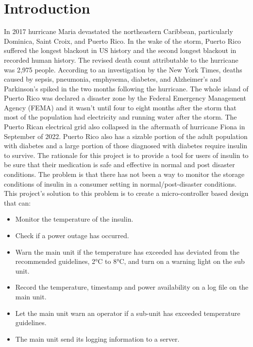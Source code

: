 \section{Introduction}
In 2017 hurricane Maria devastated the northeastern Caribbean, particularly Dominica, Saint Croix, and Puerto Rico. In the wake of the storm, Puerto Rico suffered the longest blackout in US history and the second longest blackout in recorded human history\cite{WorldSecondLargest}. The revised death count attributable to the hurricane was 2,975 people\cite{HurricaneMariaCaused2018}. According to an investigation by the New York Times, deaths caused by  sepsis, pneumonia, emphysema, diabetes, and Alzheimer's and Parkinson's spiked in the two months following the hurricane\cite{roblesOfficialTollPuerto2017}. The whole island of Puerto Rico was declared a disaster zone by the Federal Emergency Management Agency (FEMA) and it wasn't until four to eight months after the storm that most of the population had electricity and running water after the storm. The Puerto Rican electrical grid also collapsed in the aftermath of hurricane Fiona in September of 2022. Puerto Rico also has a sizable portion of the adult population with diabetes and a large portion of those diagnosed with diabetes require insulin to survive\cite{DiabetesPrevalencePopulation}. The rationale for this project is to provide a tool for users of insulin to be sure that their medication is safe and effective in normal and post disaster conditions. The problem is that there has not been a way to monitor the storage conditions of insulin in a consumer setting in normal/post-disaster conditions. This project's solution to this problem is to create a micro-controller based design that can:
\begin{itemize}
  \item Monitor the temperature of the insulin.
  \item Check if a power outage has occurred.
  \item Warn the main unit if the temperature has exceeded has deviated from the recommended guidelines, 2\si{\celsius} to 8\si{\celsius}, and turn on a warning light on the sub unit.
  \item Record the temperature, timestamp and power availability on a log file on the main unit.
  \item Let the main unit warn an operator if a sub-unit has exceeded temperature guidelines.
  \item The main unit send its logging information to a server.
\end{itemize}
